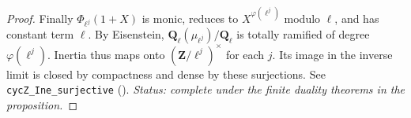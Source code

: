 \begin{proof}
Finally $\Phi_{\ell^j}(1+X)$ is monic, reduces to
$X^{\varphi(\ell^j)}$ modulo $\ell$, and has constant term $\ell$.
By Eisenstein, $\mathbf Q_\ell(\mu_{\ell^j})/\mathbf Q_\ell$ is
totally ramified of degree $\varphi(\ell^j)$. Inertia thus maps onto
$(\mathbf Z/\ell^j)^\times$ for each $j$. Its image in the inverse
limit is closed by compactness and dense by these surjections.
See \nolinkurl{cycZ_Ine_surjective}
().
\emph{Status: complete under the finite duality theorems in the proposition.}
\end{proof}


